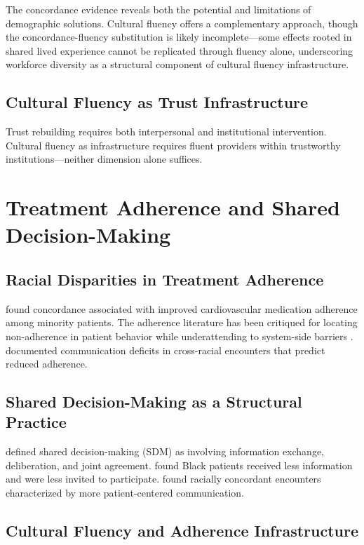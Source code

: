 \documentclass[12pt, a4paper]{article}
\begin{document}
The concordance evidence reveals both the potential and limitations of demographic solutions. Cultural fluency offers a complementary approach, though the concordance-fluency substitution is likely incomplete---some effects rooted in shared lived experience cannot be replicated through fluency alone, underscoring workforce diversity as a structural component of cultural fluency infrastructure.

\subsection{Cultural Fluency as Trust Infrastructure}

Trust rebuilding requires both interpersonal and institutional intervention. Cultural fluency as infrastructure requires fluent providers within trustworthy institutions---neither dimension alone suffices.

\section{Treatment Adherence and Shared Decision-Making}

\subsection{Racial Disparities in Treatment Adherence}

\citet{traylor2010} found concordance associated with improved cardiovascular medication adherence among minority patients. The adherence literature has been critiqued for locating non-adherence in patient behavior while underattending to system-side barriers \citep{fiscella2000}. \citet{johnson2004} documented communication deficits in cross-racial encounters that predict reduced adherence.

\subsection{Shared Decision-Making as a Structural Practice}

\citet{charles1997} defined shared decision-making (SDM) as involving information exchange, deliberation, and joint agreement. \citet{johnson2004} found Black patients received less information and were less invited to participate. \citet{cooper2003} found racially concordant encounters characterized by more patient-centered communication.

\subsection{Cultural Fluency and Adherence Infrastructure}
\end{document}
